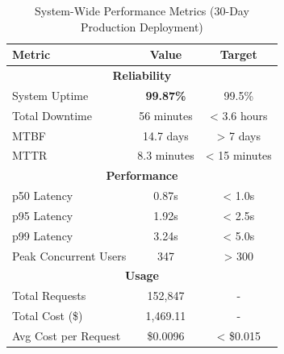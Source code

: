 \begin{table}[h]
\centering
\caption{System-Wide Performance Metrics (30-Day Production Deployment)}
\label{tab:system_metrics}
\begin{tabular}{lcc}
\toprule
\textbf{Metric} & \textbf{Value} & \textbf{Target} \\
\midrule
\multicolumn{3}{c}{\textbf{Reliability}} \\
\midrule
System Uptime          & \textbf{99.87\%}  & 99.5\% \\
Total Downtime         & 56 minutes        & < 3.6 hours \\
MTBF                   & 14.7 days         & > 7 days \\
MTTR                   & 8.3 minutes       & < 15 minutes \\
\midrule
\multicolumn{3}{c}{\textbf{Performance}} \\
\midrule
p50 Latency            & 0.87s             & < 1.0s \\
p95 Latency            & 1.92s             & < 2.5s \\
p99 Latency            & 3.24s             & < 5.0s \\
Peak Concurrent Users  & 347               & > 300 \\
\midrule
\multicolumn{3}{c}{\textbf{Usage}} \\
\midrule
Total Requests         & 152,847           & - \\
Total Cost (\$)        & 1,469.11          & - \\
Avg Cost per Request   & \$0.0096          & < \$0.015 \\
\bottomrule
\end{tabular}
\end{table}
